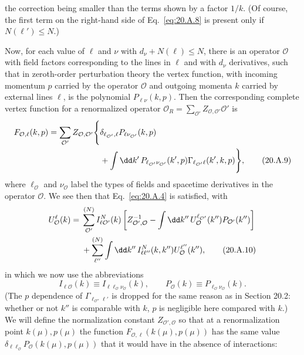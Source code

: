 \endgroup
the correction being smaller than the terms shown by a factor $1/k$. (Of course, the first term on the right-hand side of Eq.~\eqref{eq:20.A.8} is present only if $N(\ell')\leq N$.)

Now, for each value of $\ell$ and $\nu$ with $d_\nu+N(\ell)\leq N$, there is an operator $\mathcal O$ with field factors corresponding to the lines in $\ell$ and with $d_\nu$ derivatives, such that in zeroth-order perturbation theory the vertex function, with incoming momentum $p$ carried by the operator $\mathcal O$ and outgoing momenta $k$ carried by external lines $\ell$, is the polynomial $P_{\ell\nu}(k,p)$. Then the corresponding complete vertex function for a renormalized operator $\mathcal O_R=\sum_{\mathcal O'}Z_{\mathcal O,\mathcal O'}\mathcal O'$ is
\begin{align}
F_{\mathcal O,\ell}(k,p)
=\sum_{\mathcal O'}Z_{\mathcal O,\mathcal O'}
\Bigg\{&
\delta_{\ell_{\mathcal O'},\ell}
P_{\ell\nu_{\mathcal O'}}(k,p)
\notag\\
&+\int \dd k'\,
P_{\ell_{\mathcal O'}\nu_{\mathcal O'}}(k',p)
\Gamma_{\ell_{\mathcal O'}\ell}(k',k,p)
\Bigg\},
\tag{20.A.9}\label{eq:20.A.9}
\end{align}
where $\ell_{\mathcal O}$ and $\nu_{\mathcal O}$ label the types of fields and spacetime derivatives in the operator $\mathcal O$. We see then that Eq.~\eqref{eq:20.A.4} is satisfied, with
\begin{align}
U_{\mathcal O}^{\ell}(k)
={}&
\sum_{\mathcal O'}^{(N)}
I_{\ell\mathcal O'}^N(k)
\left[
Z_{\mathcal O',\mathcal O}^{-1}
-\int \dd k''\,
U_{\mathcal O}^{\ell_{\mathcal O'}}(k'')
P_{\mathcal O'}(k'')
\right]
\notag\\
&+\sum_{\ell''}^{(N)}
\int \dd k''\,
I_{\ell\ell''}^N(k,k'')
U_{\mathcal O}^{\ell''}(k''),
\tag{20.A.10}\label{eq:20.A.10}
\end{align}
in which we now use the abbreviations
\begin{equation}
I_{\ell\mathcal O}(k)
\equiv I_{\ell\ell_{\mathcal O}\nu_{\mathcal O}}(k),
\qquad
P_{\mathcal O}(k)
\equiv P_{\ell_{\mathcal O}\nu_{\mathcal O}}(k).
\tag{20.A.11}\label{eq:20.A.11}
\end{equation}
(The $p$ dependence of $\Gamma_{\ell_{\mathcal O''}\ell'}$ is dropped for the same reason as in Section 20.2: whether or not $k''$ is comparable with $k$, $p$ is negligible here compared with $k$.) We will define the normalization constant $Z_{\mathcal O',\mathcal O}$ so that at a renormalization point $k(\mu),p(\mu)$ the function $F_{\mathcal O,\ell}(k(\mu),p(\mu))$ has the same value $\delta_{\ell\ell_{\mathcal O}}P_{\mathcal O}(k(\mu),p(\mu))$ that it would have in the absence of interactions:
